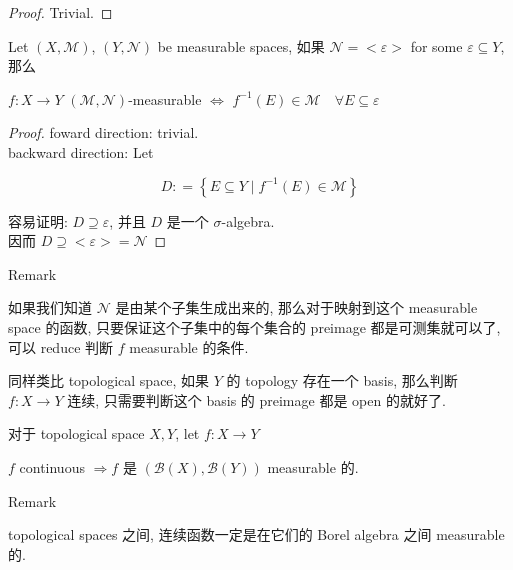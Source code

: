 \begin{proof}

Trivial.

\end{proof}

\begin{lemma}

Let \((X,\mathcal{M})\), \((Y,\mathcal{N})\) be measurable spaces, 如果 \(\mathcal{N} = < \varepsilon >\) for some \(\varepsilon \subseteq Y\), 那么

\(f:X\rightarrow Y\) \((\mathcal{M},\mathcal{N})\)-measurable \(\Leftrightarrow\) \(f^{- 1}(E) \in \mathcal{M}\quad\forall E \subseteq \varepsilon\)

\end{lemma}

\begin{proof}

foward direction: trivial.\\
backward direction: Let

\[D: = \left\{ {E \subseteq Y \mid f^{- 1}(E) \in \mathcal{M}} \right\}\]

容易证明: \(D \supseteq \varepsilon\), 并且 \(D\) 是一个 \(\sigma\)-algebra.\\
因而 \(D \supseteq < \varepsilon > = \mathcal{N}\)

\end{proof}

\begin{qlremark}{Remark}

如果我们知道 \(\mathcal{N}\) 是由某个子集生成出来的, 那么对于映射到这个 measurable space 的函数, 只要保证这个子集中的每个集合的 preimage 都是可测集就可以了, 可以 reduce 判断 \(f\) measurable 的条件.

同样类比 topological space, 如果 \(Y\) 的 topology 存在一个 basis, 那么判断 \(f:X\rightarrow Y\) 连续, 只需要判断这个 basis 的 preimage 都是 open 的就好了.

\end{qlremark}

\begin{proposition}

对于 topological space \(X,Y\), let \(f:X\rightarrow Y\)

\(f\) continuous \(\Longrightarrow\)\(f\) 是 \((\mathcal{B}(X),\mathcal{B}(Y))\) measurable 的.

\end{proposition}

\begin{qlremark}{Remark}

topological spaces 之间, 连续函数一定是在它们的 Borel algebra 之间 measurable 的.

\end{qlremark}

